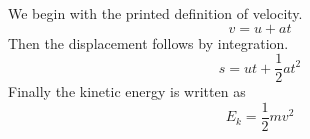 \documentclass{article}
\begin{document}
We begin with the printed definition of velocity.
\[
v = u + at
\]
Then the displacement follows by integration.
\[
s = ut + \frac{1}{2}at^2
\]
Finally the kinetic energy is written as
\[
E_k = \frac{1}{2}mv^2
\]
\end{document}
